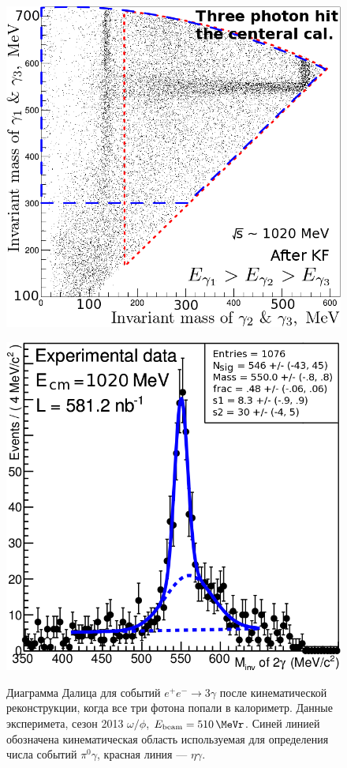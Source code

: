 \begin{figure}
	\begin{minipage}[T]{.48\textwidth}
		\centering
		\label{fig:cm12cal2}
		\includegraphics[width=\textwidth]{img/cm12cal2.png}
		\caption{Диаграмма Далица для событий $e^+ e^- \to 3 \gamma$ после кинематической реконструкции,
			когда все три фотона попали в  калориметр.
			Данные эксперимета, сезон 2013 $\omega / \phi$, $E_{\text{beam}} = \SI{510}{\MeVr}$.
			Синей линией обозначена кинематическая область используемая для определения числа событий $\pi^0 \gamma$,
			красная линия --- $\eta \gamma$.}
	\end{minipage}
	\hfill
	\begin{minipage}[T]{.48\textwidth}
		\centering
		\label{fig:etag}
		\includegraphics[width=\textwidth]{img/etag.png}

\end{minipage}
\end{figure}
